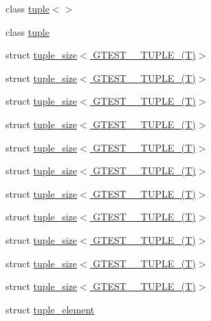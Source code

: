 \begin{DoxyCompactItemize}
\item 
class \hyperlink{classstd_1_1tr1_1_1tuple_3_4}{tuple$<$$>$}
\item 
class \hyperlink{classstd_1_1tr1_1_1tuple}{tuple}
\item 
struct \hyperlink{structstd_1_1tr1_1_1tuple__size_3_01GTEST__0__TUPLE___07T_08_4}{tuple\-\_\-size$<$ G\-T\-E\-S\-T\-\_\-\_\-\-T\-U\-P\-L\-E\-\_\-(\-T)$>$}
\item 
struct \hyperlink{structstd_1_1tr1_1_1tuple__size_3_01GTEST__1__TUPLE___07T_08_4}{tuple\-\_\-size$<$ G\-T\-E\-S\-T\-\_\-\_\-\-T\-U\-P\-L\-E\-\_\-(\-T)$>$}
\item 
struct \hyperlink{structstd_1_1tr1_1_1tuple__size_3_01GTEST__2__TUPLE___07T_08_4}{tuple\-\_\-size$<$ G\-T\-E\-S\-T\-\_\-\_\-\-T\-U\-P\-L\-E\-\_\-(\-T)$>$}
\item 
struct \hyperlink{structstd_1_1tr1_1_1tuple__size_3_01GTEST__3__TUPLE___07T_08_4}{tuple\-\_\-size$<$ G\-T\-E\-S\-T\-\_\-\_\-\-T\-U\-P\-L\-E\-\_\-(\-T)$>$}
\item 
struct \hyperlink{structstd_1_1tr1_1_1tuple__size_3_01GTEST__4__TUPLE___07T_08_4}{tuple\-\_\-size$<$ G\-T\-E\-S\-T\-\_\-\_\-\-T\-U\-P\-L\-E\-\_\-(\-T)$>$}
\item 
struct \hyperlink{structstd_1_1tr1_1_1tuple__size_3_01GTEST__5__TUPLE___07T_08_4}{tuple\-\_\-size$<$ G\-T\-E\-S\-T\-\_\-\_\-\-T\-U\-P\-L\-E\-\_\-(\-T)$>$}
\item 
struct \hyperlink{structstd_1_1tr1_1_1tuple__size_3_01GTEST__6__TUPLE___07T_08_4}{tuple\-\_\-size$<$ G\-T\-E\-S\-T\-\_\-\_\-\-T\-U\-P\-L\-E\-\_\-(\-T)$>$}
\item 
struct \hyperlink{structstd_1_1tr1_1_1tuple__size_3_01GTEST__7__TUPLE___07T_08_4}{tuple\-\_\-size$<$ G\-T\-E\-S\-T\-\_\-\_\-\-T\-U\-P\-L\-E\-\_\-(\-T)$>$}
\item 
struct \hyperlink{structstd_1_1tr1_1_1tuple__size_3_01GTEST__8__TUPLE___07T_08_4}{tuple\-\_\-size$<$ G\-T\-E\-S\-T\-\_\-\_\-\-T\-U\-P\-L\-E\-\_\-(\-T)$>$}
\item 
struct \hyperlink{structstd_1_1tr1_1_1tuple__size_3_01GTEST__9__TUPLE___07T_08_4}{tuple\-\_\-size$<$ G\-T\-E\-S\-T\-\_\-\_\-\-T\-U\-P\-L\-E\-\_\-(\-T)$>$}
\item 
struct \hyperlink{structstd_1_1tr1_1_1tuple__size_3_01GTEST__10__TUPLE___07T_08_4}{tuple\-\_\-size$<$ G\-T\-E\-S\-T\-\_\-\_\-\-T\-U\-P\-L\-E\-\_\-(\-T)$>$}
\item 
struct \hyperlink{structstd_1_1tr1_1_1tuple__element}{tuple\-\_\-element}
\end{DoxyCompactItemize}
